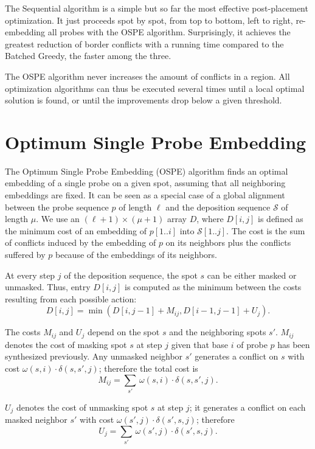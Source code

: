 \documentclass{llncs}
\begin{document}
The Sequential algorithm is a simple but so far the most effective
post-placement optimization. It just proceeds spot by spot, from top to
bottom, left to right, re-embedding all probes with the OSPE algorithm.
Surprisingly, it achieves the greatest reduction of border conflicts with a
running time compared to the Batched Greedy, the faster among the three.

The OSPE algorithm never increases the amount of conflicts in a region.  All
optimization algorithms can thus be executed several times until a local
optimal solution is found, or until the improvements drop below a given
threshold.


\section{Optimum Single Probe Embedding}
\label{sec:ospe}

The Optimum Single Probe Embedding (OSPE) algorithm finds an optimal
embedding of a single probe on a given spot, assuming that all neighboring
embeddings are fixed. It can be seen as a special case of a global alignment
between the probe sequence $p$ of length $\ell$ and the deposition sequence
$\mathcal{S}$ of length $\mu$. We use an $(\ell + 1) \times (\mu + 1)$ array
$D$, where $D[i,j]$ is defined as the minimum cost of an embedding of
$p[1..i]$ into $\mathcal{S}[1..j]$.  The cost is the sum of conflicts induced
by the embedding of $p$ on its neighbors plus the conflicts suffered by $p$
because of the embeddings of its neighbors.

At every step $j$ of the deposition sequence, the spot $s$ can be either
masked or unmasked. Thus, entry $D[i,j]$ is computed as the minimum between
the costs resulting from each possible action:
\[
D[i,j] = \min (D[i,j-1] + M_{ij}, D[i-1,j-1] + U_{j}).
\]

The costs $M_{ij}$ and $U_{j}$ depend on the spot $s$ and the neighboring
spots $s'$.
$M_{ij}$ denotes the cost of masking spot $s$ at step $j$ given that base $i$
of probe $p$ has been synthesized previously.  Any unmasked neighbor $s'$
generates a conflict on $s$ with cost $\omega(s,i)\cdot \delta(s,s',j)$;
therefore the total cost is
\[ M_{ij} = \sum_{s'}\, \omega(s,i) \cdot \delta(s,s',j). \]

$U_{j}$ denotes the cost of unmasking spot $s$ at step $j$; it generates a
conflict on each masked neighbor $s'$ with cost $\omega(s',j)\cdot
\delta(s',s,j)$; therefore 
\[ U_j = \sum_{s'}\, \omega(s',j) \cdot \delta(s',s,j). \]
\end{document}
